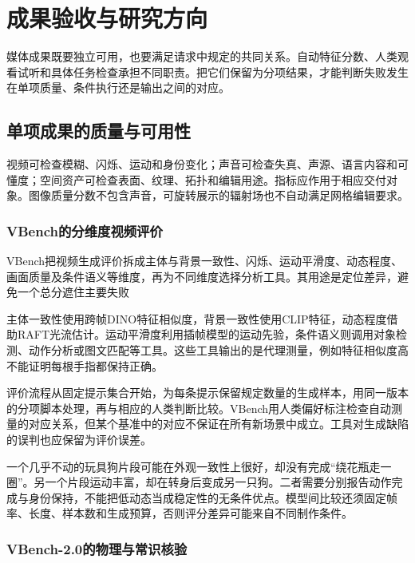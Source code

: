\section{成果验收与研究方向}
\label{sec:vision-multigen-evaluation}

媒体成果既要独立可用，也要满足请求中规定的共同关系。自动特征分数、人类观看试听和具体任务检查承担不同职责。把它们保留为分项结果，才能判断失败发生在单项质量、条件执行还是输出之间的对应。

\subsection{单项成果的质量与可用性}
\label{sec:vision-multigen-quality}

视频可检查模糊、闪烁、运动和身份变化；声音可检查失真、声源、语言内容和可懂度；空间资产可检查表面、纹理、拓扑和编辑用途。指标应作用于相应交付对象。图像质量分数不包含声音，可旋转展示的辐射场也不自动满足网格编辑要求。

\subsubsection{VBench的分维度视频评价}
\label{sec:vision-multigen-vbench}

VBench把视频生成评价拆成主体与背景一致性、闪烁、运动平滑度、动态程度、画面质量及条件语义等维度，再为不同维度选择分析工具。其用途是定位差异，避免一个总分遮住主要失败

主体一致性使用跨帧DINO特征相似度，背景一致性使用CLIP特征，动态程度借助RAFT光流估计。运动平滑度利用插帧模型的运动先验，条件语义则调用对象检测、动作分析或图文匹配等工具。这些工具输出的是代理测量，例如特征相似度高不能证明每根手指都保持正确。

评价流程从固定提示集合开始，为每条提示保留规定数量的生成样本，用同一版本的分项脚本处理，再与相应的人类判断比较。VBench用人类偏好标注检查自动测量的对应关系，但某个基准中的对应不保证在所有新场景中成立。工具对生成缺陷的误判也应保留为评价误差。

一个几乎不动的玩具狗片段可能在外观一致性上很好，却没有完成“绕花瓶走一圈”。另一个片段运动丰富，却在转身后变成另一只狗。二者需要分别报告动作完成与身份保持，不能把低动态当成稳定性的无条件优点。模型间比较还须固定帧率、长度、样本数和生成预算，否则评分差异可能来自不同制作条件。

\Needspace{65mm}
\subsubsection{VBench-2.0的物理与常识核验}
\label{sec:vision-multigen-vbench2}


